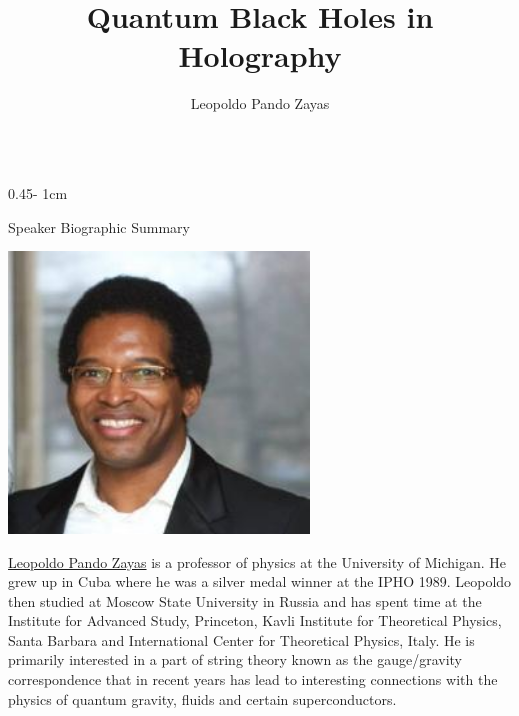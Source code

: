 \documentclass{../psuposter}
\title{Quantum Black Holes in Holography}
\author{Leopoldo Pando Zayas \inst{1}}
\institute{\inst{1} University of Michigan}
\begin{document}
\begin{frame}
\begin{columns}
\begin{column}{0.45\textwidth - 1cm}


    \begin{block}{Speaker Biographic Summary}
    	\begin{center}
    		\includegraphics[width=0.6\textwidth]{images/leopoldo-pando-zayas}
    	\end{center}
    	\href{https://www.tpi.uni-jena.de/~bernuzzi/about.html}{Leopoldo Pando Zayas} is a professor of physics at the University of Michigan. He grew up in Cuba where he was a silver medal winner at the IPHO 1989. Leopoldo then studied at Moscow State University in Russia and has spent time at the Institute for Advanced Study, Princeton, Kavli Institute for Theoretical Physics, Santa Barbara and International Center for Theoretical Physics, Italy. He is primarily interested in a part of string theory known as the gauge/gravity correspondence that in recent years has lead to interesting connections with the physics of quantum gravity, fluids and certain superconductors. \cite{LeopoldoPandoZayas}
    \end{block}



\end{column}
\end{columns}
\end{frame}
\end{document}
